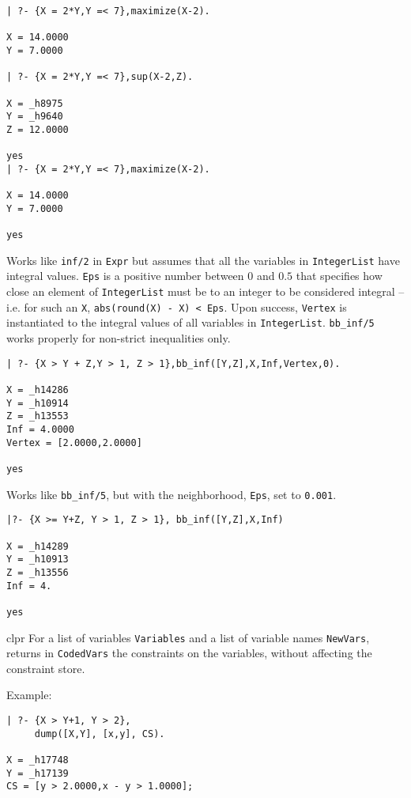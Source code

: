 \begin{description}
{\begin{verbatim}
| ?- {X = 2*Y,Y =< 7},maximize(X-2).

X = 14.0000
Y = 7.0000

| ?- {X = 2*Y,Y =< 7},sup(X-2,Z).

X = _h8975
Y = _h9640
Z = 12.0000

yes
| ?- {X = 2*Y,Y =< 7},maximize(X-2).

X = 14.0000
Y = 7.0000

yes
\end{verbatim}
}


Works like {\tt inf/2} in {\tt Expr} but assumes that all the
variables in {\tt IntegerList} have integral values.  {\tt Eps} is a
positive number between $0$ and $0.5$ that specifies how close an
element of {\tt IntegerList} must be to an integer to be considered
integral -- i.e. for such an {\tt X}, {\tt abs(round(X) - X) < Eps}.
Upon success, {\tt Vertex} is instantiated to the integral values of
all variables in {\tt IntegerList}.  {\tt bb\_inf/5} works properly for
non-strict inequalities only.

\begin{verbatim}
| ?- {X > Y + Z,Y > 1, Z > 1},bb_inf([Y,Z],X,Inf,Vertex,0).

X = _h14286
Y = _h10914
Z = _h13553
Inf = 4.0000
Vertex = [2.0000,2.0000]

yes
\end{verbatim}


Works like {\tt bb\_inf/5}, but with the neighborhood, {\tt Eps}, set
to {\tt 0.001}.

\begin{verbatim}
|?- {X >= Y+Z, Y > 1, Z > 1}, bb_inf([Y,Z],X,Inf)

X = _h14289
Y = _h10913
Z = _h13556
Inf = 4.

yes
\end{verbatim}

 {clpr} 
%
For a list of variables {\tt Variables} and a list of variable names
{\tt NewVars}, returns in {\tt CodedVars} the constraints on the
variables, without affecting the constraint store.

Example:
\begin{verbatim}
| ?- {X > Y+1, Y > 2},
     dump([X,Y], [x,y], CS).

X = _h17748
Y = _h17139
CS = [y > 2.0000,x - y > 1.0000];
\end{verbatim}

\end{description}


